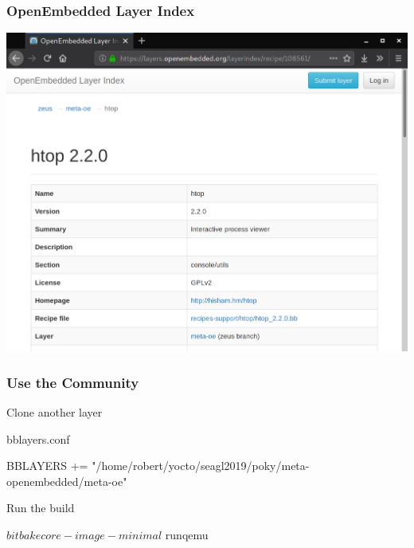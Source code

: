 \documentclass[aspectratio=169]{beamer}
\begin{document}
\begin{frame}
\frametitle{OpenEmbedded Layer Index}
\begin{center}
	\includegraphics[width=\textwidth,height=0.9\textheight,keepaspectratio]{images/htop-layer-index.png}
\end{center}
\end{frame}

\begin{frame}[fragile]
\frametitle{Use the Community}
\begin{block}{Clone another layer}
\end{block}
\begin{block}{bblayers.conf}
\begin{semiverbatim}
BBLAYERS += "/home/robert/yocto/seagl2019/poky/meta-openembedded/meta-oe"
\end{semiverbatim}
\end{block}
\begin{block}{Run the build}
\begin{semiverbatim}
$ bitbake core-image-minimal
$ runqemu
\end{semiverbatim}
\end{block}
\end{frame}
\end{document}
